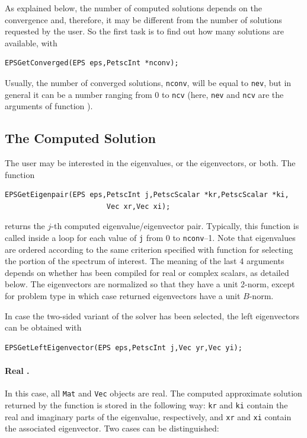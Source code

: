 	As explained below, the number of computed solutions depends on the convergence and, therefore, it may be different from the number of solutions requested by the user. So the first task is to find out how many solutions are available, with
	\begin{Verbatim}[fontsize=\small]
	EPSGetConverged(EPS eps,PetscInt *nconv);
	\end{Verbatim}
Usually, the number of converged solutions, \texttt{nconv}, will be equal to \texttt{nev}, but in general it can be a number ranging from 0 to \texttt{ncv} (here, \texttt{nev} and \texttt{ncv} are the arguments of function ).

\subsection{The Computed Solution}

	The user may be interested in the eigenvalues, or the eigenvectors, or both. The function
	\begin{Verbatim}[fontsize=\small]
	EPSGetEigenpair(EPS eps,PetscInt j,PetscScalar *kr,PetscScalar *ki,
                        Vec xr,Vec xi);
	\end{Verbatim}
returns the $j$-th computed eigenvalue/eigenvector pair. Typically, this function is called inside a loop for each value of \texttt{j} from 0 to \texttt{nconv}--1. Note that eigenvalues are ordered according to the same criterion specified with function  for selecting the portion of the spectrum of interest.
	The meaning of the last 4 arguments depends on whether \slepc has been compiled for real or complex scalars, as detailed below. The eigenvectors are normalized so that they have a unit 2-norm, except for problem type  in which case returned eigenvectors have a unit $B$-norm.

	In case the two-sided variant of the solver has been selected, the left eigenvectors can be obtained with
	\begin{Verbatim}[fontsize=\small]
	EPSGetLeftEigenvector(EPS eps,PetscInt j,Vec yr,Vec yi);
	\end{Verbatim}

\paragraph{Real \slepc.} In this case, all \texttt{Mat} and \texttt{Vec} objects are real. The computed approximate solution returned by the function  is stored in the following way: \texttt{kr} and \texttt{ki} contain the real and imaginary parts of the eigenvalue, respectively, and \texttt{xr} and \texttt{xi} contain the associated eigenvector. Two cases can be distinguished:

